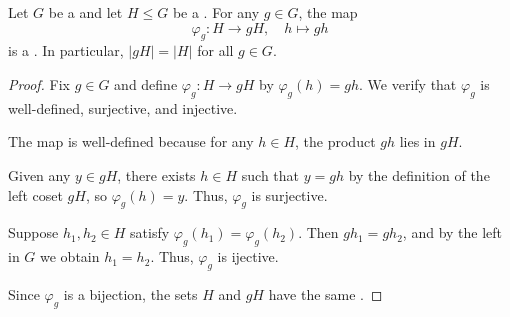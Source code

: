 \begin{lemma} \label{lemma:all_cosets_of_subgroup_have_equal_cardinality}
    Let $G$ be a  and let $H \leq G$ be a . For any $g \in G$, the map
    $$\varphi_g : H \longrightarrow gH, \quad h \longmapsto gh$$
    is a . In particular, $|gH| = |H|$ for all $g \in G$.
\end{lemma}
\begin{proof}
    Fix $g \in G$ and define $\varphi_g : H \to gH$ by $\varphi_g(h) = gh$. We verify that $\varphi_g$ is well-defined, surjective, and injective.

    The map is well-defined because for any $h \in H$, the product $gh$ lies in $gH$.

    Given any $y \in gH$, there exists $h \in H$ such that $y = gh$ by the definition of the left coset $gH$, so $\varphi_g(h) = y$. Thus, $\varphi_g$ is surjective.

    Suppose $h_1, h_2 \in H$ satisfy $\varphi_g(h_1) = \varphi_g(h_2)$. Then $gh_1 = gh_2$, and by the left  in $G$ we obtain $h_1 = h_2$. Thus, $\varphi_g$ is ijective.

    Since $\varphi_g$ is a bijection, the sets $H$ and $gH$ have the same .
\end{proof}

